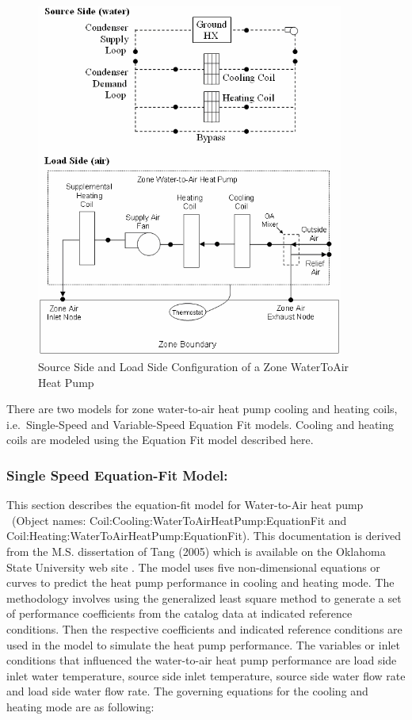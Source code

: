 \begin{figure}[hbtp] %
\centering
\includegraphics[width=0.9\textwidth, height=0.9\textheight, keepaspectratio=true]{media/image7258.png}
\caption{  Source Side and Load Side Configuration of a Zone WaterToAir Heat Pump \protect \label{fig:source-side-and-load-side-configuration-of-a-001}}
\end{figure}

There are two models for zone water-to-air heat pump cooling and heating coils, i.e.~Single-Speed and Variable-Speed Equation Fit models. Cooling and heating coils are modeled using the Equation Fit model described here.

\subsubsection{Single Speed Equation-Fit Model:}\label{single-speed-equation-fit-model-000}

This section describes the equation-fit model for Water-to-Air heat pump ~(Object names: Coil:Cooling:WaterToAirHeatPump:EquationFit and Coil:Heating:WaterToAirHeatPump:EquationFit). This documentation is derived from the M.S. dissertation of Tang (2005) which is available on the Oklahoma State University web site . The model uses five non-dimensional equations or curves to predict the heat pump performance in cooling and heating mode. The methodology involves using the generalized least square method to generate a set of performance coefficients from the catalog data at indicated reference conditions. Then the respective coefficients and indicated reference conditions are used in the model to simulate the heat pump performance. The variables or inlet conditions that influenced the water-to-air heat pump performance are load side inlet water temperature, source side inlet temperature, source side water flow rate and load side water flow rate. The governing equations for the cooling and heating mode are as following:

